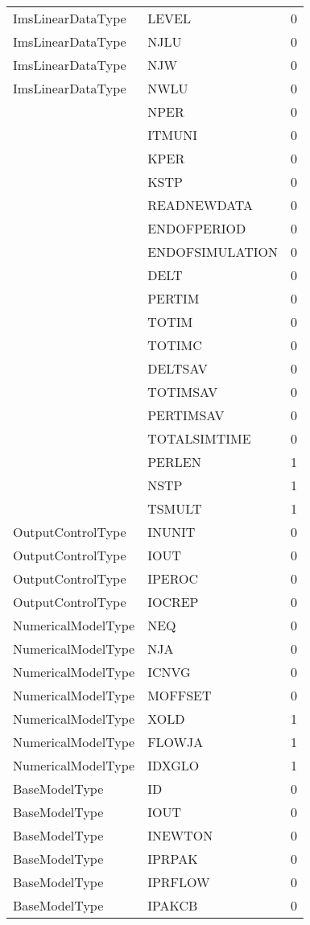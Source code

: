 \begin{longtable}{p{6cm} p{4cm} p{2cm} }
ImsLinearDataType &  LEVEL & 0 \\ 
ImsLinearDataType &  NJLU & 0 \\ 
ImsLinearDataType &  NJW & 0 \\ 
ImsLinearDataType &  NWLU & 0 \\ 
 &  NPER & 0 \\ 
 &  ITMUNI & 0 \\ 
 &  KPER & 0 \\ 
 &  KSTP & 0 \\ 
 &  READNEWDATA & 0 \\ 
 &  ENDOFPERIOD & 0 \\ 
 &  ENDOFSIMULATION & 0 \\ 
 &  DELT & 0 \\ 
 &  PERTIM & 0 \\ 
 &  TOTIM & 0 \\ 
 &  TOTIMC & 0 \\ 
 &  DELTSAV & 0 \\ 
 &  TOTIMSAV & 0 \\ 
 &  PERTIMSAV & 0 \\ 
 &  TOTALSIMTIME & 0 \\ 
 &  PERLEN & 1 \\ 
 &  NSTP & 1 \\ 
 &  TSMULT & 1 \\ 
OutputControlType &  INUNIT & 0 \\ 
OutputControlType &  IOUT & 0 \\ 
OutputControlType &  IPEROC & 0 \\ 
OutputControlType &  IOCREP & 0 \\ 
NumericalModelType &  NEQ & 0 \\ 
NumericalModelType &  NJA & 0 \\ 
NumericalModelType &  ICNVG & 0 \\ 
NumericalModelType &  MOFFSET & 0 \\ 
NumericalModelType &  XOLD & 1 \\ 
NumericalModelType &  FLOWJA & 1 \\ 
NumericalModelType &  IDXGLO & 1 \\ 
BaseModelType &  ID & 0 \\ 
BaseModelType &  IOUT & 0 \\ 
BaseModelType &  INEWTON & 0 \\ 
BaseModelType &  IPRPAK & 0 \\ 
BaseModelType &  IPRFLOW & 0 \\ 
BaseModelType &  IPAKCB & 0 \\ 

\end{longtable}
